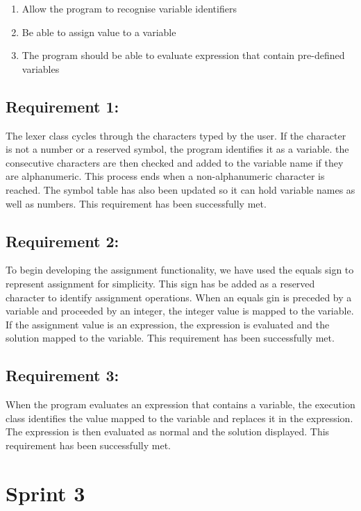 \documentclass[a4paper, oneside, 11pt]{report}
\begin{document}
\begin{enumerate}
\item Allow the program to recognise variable identifiers
\item Be able to assign value to a variable
\item The program should be able to evaluate expression that contain pre-defined variables
\end{enumerate}

\subsection{Requirement 1: }

The lexer class cycles through the characters typed by the user. If the character is not a number or a reserved symbol, the program identifies it as a variable. the consecutive characters are then checked and added to the variable name if they are alphanumeric. This process ends when a non-alphanumeric character is reached.
The symbol table has also been updated so it can hold variable names as well as numbers.
This requirement has been successfully met.

\subsection{Requirement 2: }

To begin developing the assignment functionality, we have used the equals sign to represent assignment for simplicity. This sign has be added as a reserved character to identify assignment operations. When an equals gin is preceded by a variable and proceeded by an integer, the integer value is mapped to the variable. If the assignment value is an expression, the expression is evaluated and the solution mapped to the variable.
This requirement has been successfully met.

\subsection{Requirement 3: }

When the program evaluates an expression that contains a variable, the execution class identifies the value mapped to the variable and replaces it in the expression. The expression is then evaluated as normal and the solution displayed.
This requirement has been successfully met.

\section{Sprint 3}
\end{document}
